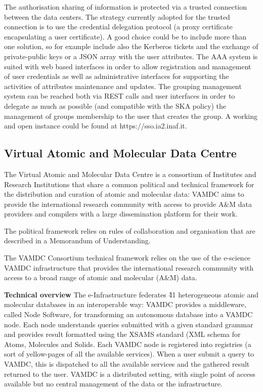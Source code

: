 \documentclass[fleqn,11pt]{wlscirep}
\begin{document}
{The authorisation sharing of information is protected via a trusted connection between the data centers. The strategy currently adopted for the trusted connection is to use the credential delegation protocol (a proxy certificate encapsulating a user certificate). A good choice could be to include more than one solution, so for example include also the Kerberos tickets and the exchange of private-public keys or a JSON array with the user attributes. The AAA system is suited with web based interfaces in order to allow registration and management of user credentials as well as administrative interfaces for supporting the activities of attributes maintenance and updates. The grouping management system can be reached both via REST calls and user interfaces in order to delegate as much as possible (and compatible with the SKA policy) the management of groups membership to the user that creates the group. A working and open instance could be found at https://sso.ia2.inaf.it.

\subsection{Virtual Atomic and Molecular Data Centre}
The Virtual Atomic and Molecular Data Centre is a consortium of Institutes and Research Institutions that share a common political and technical framework for the distribution and curation of atomic and molecular data: VAMDC aims to provide the international research community with access to provide A\&M data providers and compilers with a large dissemination platform for their work.
 
The political framework relies on rules of collaboration and organisation that are described in a Memorandum of Understanding.
 
The VAMDC Consortium technical framework relies on the use of the e-science VAMDC infrastructure that provides the international research community with access to a broad range of atomic and molecular (A\&M) data.
 
\textbf{Technical overview}
The e-Infrastructure federates \~41 heterogeneous atomic and molecular databases in an interoperable way: VAMDC provides a middleware, called Node Software, for transforming an autonomous database into a VAMDC node. Each node understands queries submitted with a given standard grammar\cite{vamdc-standards} and provides result formatted using the XSAMS standard (XML schema for Atoms, Molecules and Solids\cite{vamdc-ref}.  Each VAMDC node is registered into registries (a sort of yellow-pages of all the available services). When a user submit a query to VAMDC, this is dispatched to all the available services and the gathered result returned to the user. VAMDC is a distributed setting, with single point of access available\cite{vamdc-home} but no central management of the data or the infrastructure.
 
}
\end{document}

